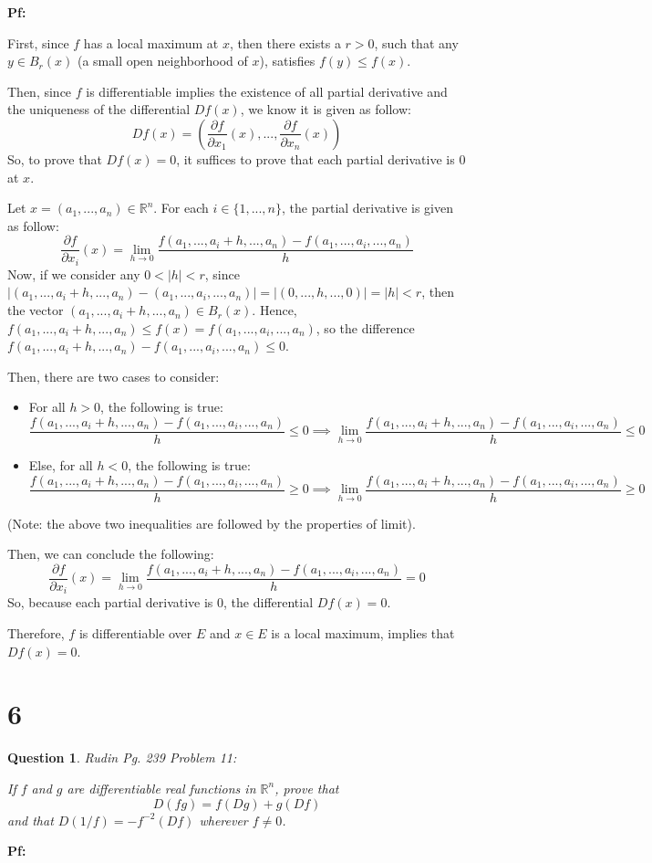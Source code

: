 \documentclass{article}
\newtheorem{question}{Question}
\begin{document}
\textbf{Pf:}

First, since $f$ has a local maximum at $x$, then there exists a $r>0$, such that any $y\in B_r(x)$ (a small open neighborhood of $x$),
satisfies $f(y)\leq f(x)$. 

Then, since $f$ is differentiable implies the existence of all partial derivative and the uniqueness of the differential $Df(x)$, we know it is given as follow:
$$Df(x)=\left(\frac{\partial f}{\partial x_1}(x),...,\frac{\partial f}{\partial x_n}(x)\right)$$
So, to prove that $Df(x)=0$, it suffices to prove that each partial derivative is $0$ at $x$.

\hfil

Let $x=(a_1,...,a_n)\in\mathbb{R}^n$. For each $i\in\{1,...,n\}$, the partial derivative is given as follow:
$$\frac{\partial f}{\partial x_i}(x)=\lim_{h\rightarrow 0}\frac{f(a_1,...,a_i+h,...,a_n)-f(a_1,...,a_i,...,a_n)}{h}$$
Now, if we consider any $0<|h|<r$, since $|(a_1,...,a_i+h,...,a_n)-(a_1,...,a_i,...,a_n)|=|(0,...,h,...,0)| = |h|<r$, then the vector $(a_1,...,a_i+h,...,a_n)\in B_r(x)$. 
Hence, $f(a_1,...,a_i+h,...,a_n) \leq f(x)=f(a_1,...,a_i,...,a_n)$, so the difference $f(a_1,...,a_i+h,...,a_n)-f(a_1,...,a_i,...,a_n)\leq 0$.

Then, there are two cases to consider:
\begin{itemize}
    \item For all $h>0$, the following is true:
    $$\frac{f(a_1,...,a_i+h,...,a_n)-f(a_1,...,a_i,...,a_n)}{h}\leq 0\implies \lim_{h\rightarrow 0}\frac{f(a_1,...,a_i+h,...,a_n)-f(a_1,...,a_i,...,a_n)}{h}\leq 0$$
    \item Else, for all $h<0$, the following is true:
    $$\frac{f(a_1,...,a_i+h,...,a_n)-f(a_1,...,a_i,...,a_n)}{h}\geq 0\implies \lim_{h\rightarrow 0}\frac{f(a_1,...,a_i+h,...,a_n)-f(a_1,...,a_i,...,a_n)}{h}\geq 0$$
\end{itemize}
(Note: the above two inequalities are followed by the properties of limit).

Then, we can conclude the following:
$$\frac{\partial f}{\partial x_i}(x)=\lim_{h\rightarrow 0}\frac{f(a_1,...,a_i+h,...,a_n)-f(a_1,...,a_i,...,a_n)}{h}=0$$
So, because each partial derivative is $0$, the differential $Df(x)=0$.

Therefore, $f$ is differentiable over $E$ and $x\in E$ is a local maximum, implies that $Df(x)=0$.

\break

\section*{6}
\begin{myBox}[]{}
    \begin{question}
        Rudin Pg. 239 Problem 11:

        If $f$ and $g$ are differentiable real functions in $\mathbb{R}^n$, prove that 
        $$D(fg)=f(Dg)+g(Df)$$
        and that $D(1/f)=-f^{-2}(Df)$ wherever $f\neq 0$.
    \end{question}
\end{myBox}

\textbf{Pf:}
\end{document}
